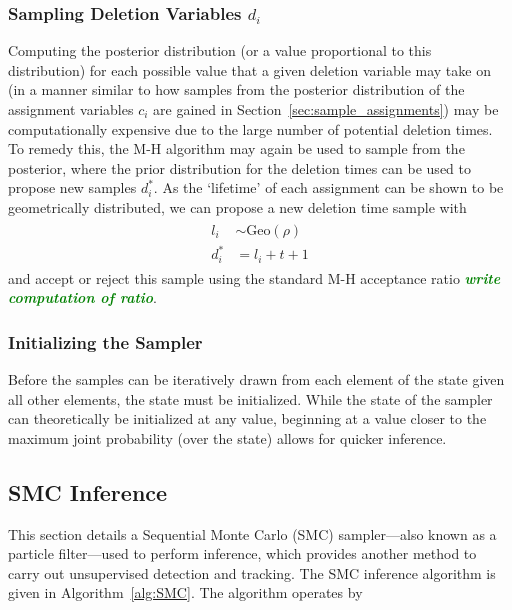 \documentclass[smallcondensed, final]{svjour3}
\newcommand{\willie}[1]{\textcolor{green}{\textsf{\emph{\textbf{\textcolor{green}{#1}}}}}}
\begin{document}
\subsubsection{Sampling Deletion Variables $d_{i}$}
Computing the posterior distribution (or a value proportional to this distribution) for each possible value that a given deletion variable may take on (in a manner similar to how samples from the posterior distribution of the assignment variables $c_{i}$ are gained in Section~\ref{sec:sample_assignments}) may be computationally expensive due to the large number of potential deletion times. To remedy this, the M-H algorithm may again be used to sample from the posterior, where the prior distribution for the deletion times can be used to propose new samples $d_{i}^{*}$. As the `lifetime' of each assignment can be shown to be geometrically distributed, we can propose a new deletion time sample with
\begin{align}
\begin{split}
l_{i}  &\sim  \text{Geo}(\rho)  \\
d_{i}^{*}  &= l_{i} + t + 1
\end{split}
\end{align}
and accept or reject this sample using the standard M-H acceptance ratio \willie{write computation of ratio}.



\subsubsection{Initializing the Sampler}
Before the samples can be iteratively drawn from each element of the state given all other elements, the state must be initialized. While the state of the sampler can theoretically be initialized at any value, beginning at a value closer to the maximum joint probability (over the state) allows for quicker inference.



\subsection{SMC Inference}
\label{sec:SMC}

This section details a Sequential Monte Carlo (SMC) sampler---also known as a particle filter---used to perform inference, which provides another method to carry out unsupervised detection and tracking. The SMC inference algorithm is given in Algorithm~\ref{alg:SMC}. The algorithm operates by 
\end{document}
